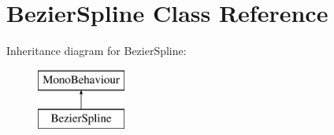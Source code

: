 \hypertarget{class_bezier_spline}{}\section{Bezier\+Spline Class Reference}
\label{class_bezier_spline}
Inheritance diagram for Bezier\+Spline\+:\begin{figure}[H]
\begin{center}
\leavevmode
\includegraphics[height=2.000000cm]{class_bezier_spline}
\end{center}
\end{figure}
